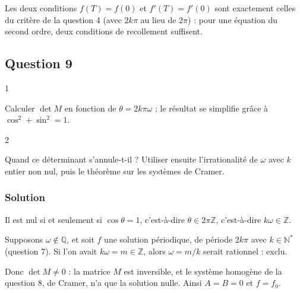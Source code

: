 \documentclass[11pt,a4paper]{article}
\newcommand{\equationajustee}[1]{%
  \sbox{\boiteequation}{$\displaystyle #1$}%
  \ifdim\wd\boiteequation>\linewidth
    \[\resizebox{\linewidth}{!}{\usebox{\boiteequation}}\]%
  \else
    \[#1\]%
  \fi}
\begin{document}
\begin{methode}

Les deux conditions \(f(T)=f(0)\) et \(f'(T)=f'(0)\) sont exactement celles du critère de la question 4 (avec \(2k\pi\) au lieu de \(2\pi\)) : pour une équation du second ordre, deux conditions de recollement suffisent.

\end{methode}

\hypertarget{question-9}{%
\subsection{Question 9}\label{question-9}}

\begin{indication}{1}

Calculer \(\det M\) en fonction de \(\theta=2k\pi\omega\) ; le résultat se simplifie grâce à \(\cos^2+\sin^2=1\).

\end{indication}

\begin{indication}{2}

Quand ce déterminant s'annule-t-il ? Utiliser ensuite l'irrationalité de \(\omega\) avec \(k\) entier non nul, puis le théorème sur les systèmes de Cramer.

\end{indication}

\hypertarget{solution-8}{%
\subsubsection{Solution}\label{solution-8}}

\equationajustee{\begin{aligned}
\det M&=(\cos\theta-1)^2-\frac{\sin\theta}{\omega}\cdot(-\omega\sin\theta)\\
&=(\cos\theta-1)^2+\sin^2\theta\\
&=2(1-\cos\theta)\\
&=4\sin^2(k\pi\omega).
\end{aligned}}
Il est nul si et seulement si \(\cos\theta=1\), c'est-à-dire \(\theta\in2\pi\mathbb Z\), c'est-à-dire \(k\omega\in\mathbb Z\).

Supposons \(\omega\notin\mathbb Q\), et soit \(f\) une solution périodique, de période \(2k\pi\) avec \(k\in\mathbb N^*\) (question 7). Si l'on avait \(k\omega=m\in\mathbb Z\), alors \(\omega=m/k\) serait rationnel : exclu.

Donc \(\det M\neq0\) : la matrice \(M\) est inversible, et le système homogène de la question 8, de Cramer, n'a que la solution nulle. Ainsi \(A=B=0\) et \(f=f_0\).
\end{document}
